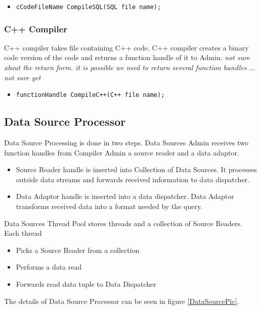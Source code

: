 \documentclass[14pt]{article}
\begin{document}
\begin{itemize}
	\item {\tt cCodeFileName CompileSQL(SQL file name);}
\end{itemize}

\subsubsection{C++ Compiler}

C++ compiler takes file containing C++ code. C++ compiler creates a binary code version of the code and returns a function handle of it to Admin. \emph{not sure about the return form. it is possible we need to return several function handles ... not sure yet}

\begin{itemize}
	\item {\tt functionHandle CompileC++(C++ file name);}
\end{itemize}

\subsection{Data Source Processor}

\noindent Data Source Processing is done in two steps. Data Sources Admin receives two function handles from Compiler Admin a source reader and a data adaptor. 

\begin{itemize}
\item Source Reader handle is inserted into Collection of Data Sources. It processes outside data streams and forwards received information to data dispatcher.
\item Data Adaptor handle is inserted into a data dispatcher. Data Adaptor transforms received data into a format needed by the query.
\end{itemize} 

Data Sources Thread Pool stores threads and a collection of Source Readers. Each thread 

\begin{itemize}
	\item Picks a Source Reader from a collection
	\item Performs a data read 
	\item Forwards read data tuple to Data Dispatcher
\end{itemize}

\noindent The details of Data Source Processor can be seen in figure \ref{DataSourcePic}.
\end{document}
